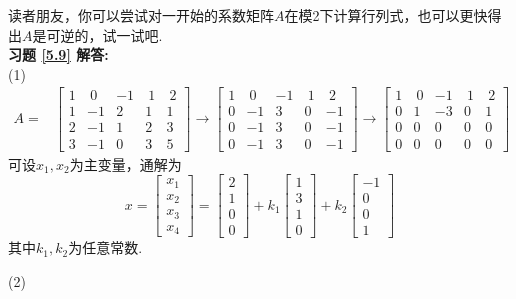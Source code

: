 \documentclass[a4paper]{book}
\begin{document}
读者朋友，你可以尝试对一开始的系数矩阵$A$在模2下计算行列式，也可以更快得出$A$是可逆的，试一试吧.\\
\textbf{习题 \ref{5.9} 解答:}\\
(1)
\begin{displaymath}
\begin{aligned}
A=&\begin{bmatrix} 1&\ 0&-1&\ 1&\ 2\\1&-1&2&1&1\\2&-1&1&2&3\\3&-1&0&3&5  \end{bmatrix}\rightarrow
\begin{bmatrix}1&\ 0&-1&\ 1&\ 2\\0&-1&3&0&-1\\0&-1&3&0&-1\\0&-1&3&0&-1   \end{bmatrix}\rightarrow
\begin{bmatrix} 1&\ 0&-1&\ 1&\ 2\\0&1&-3&0&1\\0&0&0&0&0\\0&0&0&0&0  \end{bmatrix}\end{aligned} \end{displaymath}
可设$x_1,x_2$为主变量，通解为
\begin{displaymath}
x=\begin{bmatrix}x_1\\x_2\\x_3\\x_4\end{bmatrix}=\begin{bmatrix}2\\1\\0\\0\end{bmatrix}
+k_1\begin{bmatrix}1\\3\\1\\0\end{bmatrix}+k_2\begin{bmatrix}-1\\0\\0\\1\end{bmatrix}
\end{displaymath}
其中$k_1,k_2$为任意常数.

(2)
\end{document}
